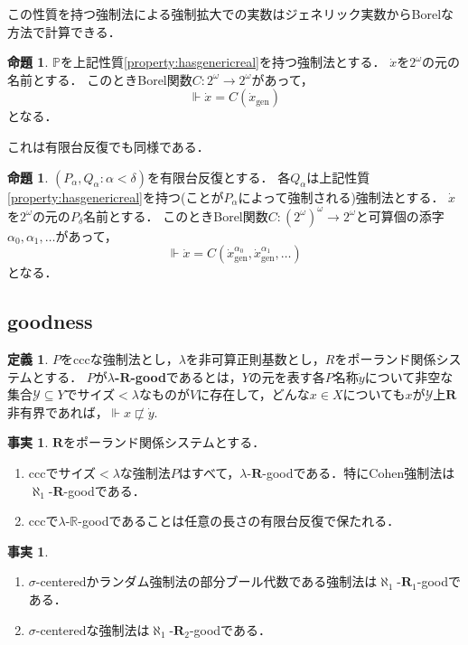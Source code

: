 \documentclass[uplatex,dvipdfmx]{jsarticle}
\renewcommand{\P}{\mathbb{P}}
\newcommand{\R}{\mathbb{R}}
\newcommand\forces{\Vdash}
\newcommand{\relR}{\mathbf{R}}
\renewcommand\subset{\subseteq}
\theoremstyle{definition}
\newtheorem{defi}[thm]{定義}
\newtheorem{fact}[thm]{事実}
\newtheorem{prop}[thm]{命題}
\begin{document}
		この性質を持つ強制法による強制拡大での実数はジェネリック実数からBorelな方法で計算できる．
		\begin{prop}
			$\P$を上記性質\ref{property:hasgenericreal}を持つ強制法とする．
			$\dot{x}$を$2^\omega$の元の名前とする．
			このときBorel関数$C \colon 2^\omega \to 2^\omega$があって，
			\[
			\forces \dot{x} = C(\dot{x}_\mathrm{gen})
			\]
			となる．
		\end{prop}
	
		これは有限台反復でも同様である．
		\begin{prop}
		$(P_\alpha, Q_\alpha : \alpha < \delta)$を有限台反復とする．
		各$Q_\alpha$は上記性質\ref{property:hasgenericreal}を持つ(ことが$P_\alpha$によって強制される)強制法とする．
		$\dot{x}$を$2^\omega$の元の$P_\delta$名前とする．
		このときBorel関数$C \colon (2^\omega)^\omega \to 2^\omega$と可算個の添字$\alpha_0, \alpha_1, \dots$があって，
		\[
		\forces \dot{x} = C(\dot{x}_\mathrm{gen}^{\alpha_0}, \dot{x}_\mathrm{gen}^{\alpha_1}, \dots)
		\]
		となる．
		\end{prop}
		
	\subsection{goodness}
	
	\begin{defi}
		$P$をcccな強制法とし，$\lambda$を非可算正則基数とし，$R$をポーランド関係システムとする．
		$P$が\textbf{$\lambda$-$\relR$-good}であるとは，$Y$の元を表す各$P$名称$\dot{y}$について非空な集合$\mathscr{Y} \subset Y$でサイズ$<\lambda$なものが$V$に存在して，どんな$x \in X$についても$x$が$\mathscr{Y}$上$\relR$非有界であれば，$\forces x \not \sqsubset \dot{y}$.
	\end{defi}

	\begin{fact}
		$\relR$をポーランド関係システムとする．
		\begin{enumerate}
			\item cccでサイズ$< \lambda$な強制法$P$はすべて，$\lambda$-$\relR$-goodである．特にCohen強制法は$\aleph_1$-$\relR$-goodである．
			\item cccで$\lambda$-$\R$-goodであることは任意の長さの有限台反復で保たれる．
		\end{enumerate}
	\end{fact}

	\begin{fact}
	\begin{enumerate}
		\item $\sigma$-centeredかランダム強制法の部分ブール代数である強制法は$\aleph_1$-$\relR_1$-goodである．
		\item $\sigma$-centeredな強制法は$\aleph_1$-$\relR_2$-goodである．
	\end{enumerate}
	\end{fact}
\end{document}
